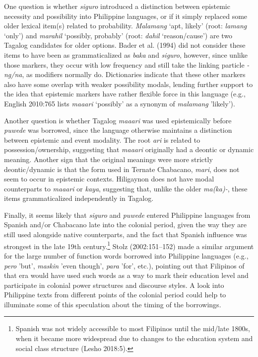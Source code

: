 \documentclass[12pt]{article}
\newenvironment{styleStandard}{\setlength\leftskip{0cm}\setlength\rightskip{0cm plus 1fil}\setlength\parindent{0cm}\setlength\parfillskip{0pt plus 1fil}\setlength\parskip{0in plus 1pt}\writerlistparindent\writerlistleftskip\leavevmode\normalfont\normalsize\writerlistlabel\ignorespaces}{\unskip\vspace{0.111in plus 0.0111in}\par}
\newcommand\writerlistleftskip{}
\newcommand\writerlistparindent{}
\newcommand\writerlistlabel{}
\begin{document}
\begin{styleStandard}
One question is whether \textit{siguro }introduced a distinction between epistemic necessity and possibility into Philippine languages, or if it simply replaced some older lexical item(s) related to probability. \textit{Malamang }‘apt, likely’ (root: \textit{lamang }‘only’) and \textit{marahil }‘possibly, probably’ (root: \textit{dahil }‘reason/cause’) are two Tagalog candidates for older options. Bader et al. (1994) did not consider these items to have been as grammaticalized as \textit{baka} and \textit{siguro}, however, since unlike those markers, they occur with low frequency and still take the linking particle \textit{{}-ng/na}, as modifiers normally do. Dictionaries indicate that these other markers also have some overlap with weaker possibility modals, lending further support to the idea that epistemic markers have rather flexible force in this language (e.g., English 2010:765 lists \textit{maaari} ‘possibly’ as a synonym of \textit{malamang} 'likely'). 
\end{styleStandard}

\begin{styleStandard}
Another question is whether Tagalog \textit{maaari} was used epistemically before \textit{puwede }was borrowed, since the language otherwise maintains a distinction between epistemic and event modality. The root \textit{ari} is related to possession/ownership, suggesting that \textit{maaari} originally had a deontic or dynamic meaning. Another sign that the original meanings were more strictly deontic/dynamic is that the form used in Ternate Chabacano, \textit{mari}, does not seem to occur in epistemic contexts. Hiligaynon does not have modal counterparts to \textit{maaari} or \textit{kaya}, suggesting that, unlike the older \textit{ma(ka)-}, these items grammaticalized independently in Tagalog. 
\end{styleStandard}

\begin{styleStandard}
Finally, it seems likely that \textit{siguro }and \textit{puwede }entered Philippine languages from Spanish and/or Chabacano late into the colonial period, given the way they are still used alongside native counterparts, and the fact that Spanish influence was strongest in the late 19th century.\footnote{ Spanish was not widely accessible to most Filipinos until the mid/late 1800s, when it became more widespread due to changes to the education system and social class structure (Lesho 2018:5). } Stolz (2002:151–152) made a similar argument for the large number of function words borrowed into Philippine languages (e.g., \textit{pero} 'but', \textit{maskin} 'even though', \textit{para} 'for', etc.), pointing out that Filipinos of that era would have used such words as a way to mark their education level and participate in colonial power structures and discourse styles. A look into Philippine texts from different points of the colonial period could help to illuminate some of this speculation about the timing of the borrowings.
\end{styleStandard}
\end{document}
